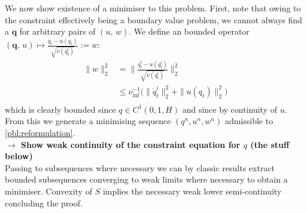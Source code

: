 \documentclass[runningheads]{llncs}
\newcommand{\norm}[2]{\| #1 \|_{ #2 }}
\newcommand{\ltwonorm}[1]{\norm{ #1 }{2}}
\newcommand{\nuinf}{\nu_\text{inf}}
\begin{document}
We now show existence of a minimiser to this problem. First, note that owing to
the constraint effectively being a boundary value problem, we cannot always find
a $\mathbf q$ for arbitrary pairs of $(u,\,w)$. We define an bounded operator
$(\mathbf q,\, u)\mapsto \frac{\dot{q_t} - u(q_t)}{\sqrt{\nu(q_t^i)}} := w$:
\begin{align*}
\ltwonorm{w}^2 & = \ltwonorm{\frac{\dot{q}_t^i - u(q_t^i)}{\sqrt{\nu(q_t^i)}}}^2\\
& \leq \nuinf^{-1}\Big(\ltwonorm{\dot{q}_t^i}^2 + \ltwonorm{u(q_t)}^2\Big)\\
\end{align*}
which is clearly bounded since $q\in C^1(0,1,H)$ and since by continuity of $u$.
From this we generate a minimising sequence $(q^n, u^n, w^n)$ admissible to
\eqref{pbl:reformulation}.\\

\textbf{$\longrightarrow$ Show weak continuity of the constraint equation for
$q$ (the stuff below)}\\

Passing to subsequences where necessary we can by classic results
\cite{younes2010shapes} extract bounded subsequences converging to weak limits
where necessary to obtain a minimiser. Convexity of $S$ implies the necessary
weak lower semi-continuity concluding the proof.

\end{document}
